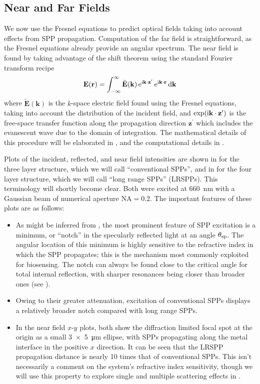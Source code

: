 \subsection{Near and Far Fields} \label{sec:fresnelnearfar}
We now use the Fresnel equations to predict optical fields taking into
account effects from SPP propagation.  Computation of the far field is
straightforward, as the Fresnel equations already provide an angular
spectrum.  The near field is found by taking advantage of the shift theorem
using the standard Fourier transform recipe
\begin{equation}
\mathbf{E}(\mathbf{r}) = \int_{-\infty}^{\infty} \tilde{\mathbf{E}}(\mathbf{k})
\,{\mathrm{e}}^{{\mathrm{i}} \mathbf{k} \cdot \mathbf{z}^\prime}
\,{\mathrm{e}}^{{\mathrm{i}} \mathbf{k} \cdot \mathbf{r}}\,\mathrm{d} \mathbf{k}
\end{equation}
where $\tilde{\mathbf{E}}(\mathbf{k})$ is the $k$-space electric field
found using the Fresnel equations, taking into account the distribution of
the incident field, and $\exp({\mathrm{i}} \mathbf{k} \cdot
\mathbf{z}^\prime)$ is the free-space transfer function along the 
propagation direction $\mathbf{z}^\prime$ which includes the evanescent
wave due to the domain of integration.  The mathematical details of this procedure
will be elaborated in , and the
computational details in .

Plots of the incident, reflected, and near field intensities are shown in
 for the three layer structure, which we
will call ``conventional SPPs'', and in 
for the four layer structure, which we will call ``long range SPPs''
(LRSPPs).  This terminology will shortly become clear.  Both were excited
at \SI{660}{\nano\meter} with a Gaussian beam of numerical aperture
$\mathrm{NA}=0.2$.  The important features of these plots are as follows:
\begin{itemize}
\item As might be inferred from ,
the most prominent feature of SPP excitation is a minimum, or ``notch'' in
the specularly reflected light at an angle $\theta_\mathrm{sp}$.  The angular
location of this minimum is highly sensitive to the refractive index in
which the SPP propagates; this is the mechanism most commonly exploited for
biosensing.  The notch can always be found close to the critical
angle for total internal reflection, with sharper resonances being closer
than broader ones (see ).
\item Owing to their greater attenuation, excitation of conventional SPPs
displays a relatively broader notch compared with long range SPPs.
\item In the near field $x$-$y$ plots, both show the diffraction limited
focal spot at the origin as a small \SI{3x5}{\micro\meter} ellipse, with
SPPs propagating along the metal interface in the positive $x$ direction.
It can be seen that the LRSPP propagation distance is nearly 10 times that
of conventional SPPs.  This isn't necessarily a comment on the system's
refractive index sensitivity, though we will use this property to explore
single and multiple scattering effects in .
\end{itemize}

